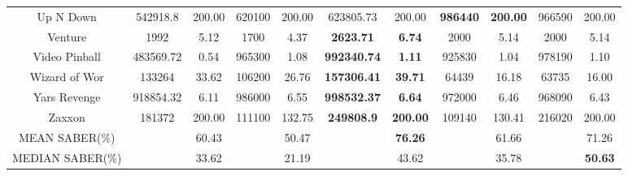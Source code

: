 \documentclass[nohyperref]{article}
\def\GDIHmeanSABER{71.26}
\def\GDIHmedianSABER{50.63}
\def\GDIImeanSABER{61.66}
\def\GDIImedianSABER{35.78}
\def\rtdtmeanSABER{60.43}
\def\rtdtmedianSABER{33.62}
\def\ngumeanSABER{50.47}
\def\ngumedianSABER{21.19}
\def\agentmeanSABER{76.26}
\def\agentmedianSABER{43.62}
\newcommand{\best}[1]{\textbf{#1}}
\theoremstyle{plain}
\begin{document}
\begin{table}[!hb]
\begin{center}
\begin{tabular}{ |c| c c| c c| c c| c c| c c| }
 Up N Down          & 542918.8          & 200.00            & 620100          & 200.00         & 623805.73            &200.00                    &\best{986440}     &\textbf{200.00}    &966590          &200.00\\
 Venture            & 1992              & 5.12              & 1700            & 4.37           &\textbf{2623.71}      &\textbf{6.74}             &2000              &5.14               &2000            &5.14\\
 Video Pinball      & 483569.72         & 0.54              & 965300          & 1.08           &\textbf{992340.74}    &\textbf{1.11}             &925830            &1.04               &978190          &1.10\\
 Wizard of Wor      & 133264            & 33.62             & 106200          & 26.76          &\textbf{157306.41}    &\textbf{39.71}            &64439             &16.18              &63735           &16.00\\
 Yars Revenge       & 918854.32         & 6.11              & 986000          & 6.55           &\textbf{998532.37}    &\textbf{6.64}             &972000            &6.46               &968090          &6.43\\
 Zaxxon             & 181372            & 200.00            & 111100          & 132.75         &\textbf{249808.9}     &\textbf{200.00}           &109140            &130.41             &216020          &200.00\\
\hline
MEAN SABER(\%)        &                   & \rtdtmeanSABER            &                 &  \ngumeanSABER         &                      & \textbf{\agentmeanSABER}  &                  & \GDIImeanSABER &      & \GDIHmeanSABER \\
\hline
MEDIAN SABER(\%)      &                   & \rtdtmedianSABER            &                 & \ngumedianSABER          &                      & \agentmedianSABER  &                  & \GDIImedianSABER &      & \textbf{\GDIHmedianSABER}  \\
\hline
\end{tabular}
\end{center}
\end{table}
\clearpage
\end{document}
